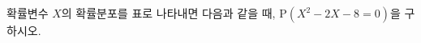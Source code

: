 확률변수 $X$의 확률분포를 표로 나타내면 다음과 같을 때, $\mathrm{P}(X^2-2X-8=0)$을 구하시오. 
\par\smallskip\begin{center}\resizebox{\ifdim\width>\linewidth\linewidth\else\width\fi}{!}{}\end{center}
